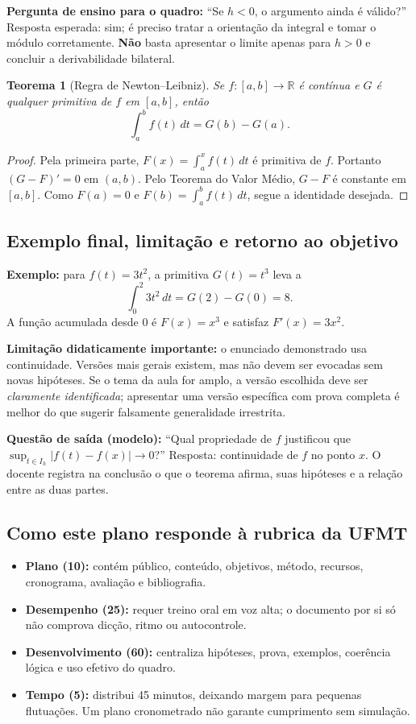 \documentclass[11pt,a4paper]{article}
\newtheorem{teorema}{Teorema}
\begin{document}
\textbf{Pergunta de ensino para o quadro:} ``Se $h<0$, o argumento ainda é válido?'' Resposta esperada: sim; é preciso tratar a orientação da integral e tomar o módulo corretamente. \textbf{Não} basta apresentar o limite apenas para $h>0$ e concluir a derivabilidade bilateral.

\begin{teorema}[Regra de Newton--Leibniz]
Se $f:[a,b]\to\mathbb R$ é contínua e $G$ é qualquer primitiva de $f$ em $[a,b]$, então
\[\int_a^b f(t)\,dt=G(b)-G(a).\]
\end{teorema}
\begin{proof}
Pela primeira parte, $F(x)=\int_a^x f(t)\,dt$ é primitiva de $f$. Portanto $(G-F)'=0$ em $(a,b)$. Pelo Teorema do Valor Médio, $G-F$ é constante em $[a,b]$. Como $F(a)=0$ e $F(b)=\int_a^b f(t)\,dt$, segue a identidade desejada.
\end{proof}

\subsection{Exemplo final, limitação e retorno ao objetivo}
\textbf{Exemplo:} para $f(t)=3t^2$, a primitiva $G(t)=t^3$ leva a
\[
\int_0^2 3t^2\,dt=G(2)-G(0)=8.
\]
A função acumulada desde 0 é $F(x)=x^3$ e satisfaz $F'(x)=3x^2$.

\textbf{Limitação didaticamente importante:} o enunciado demonstrado usa continuidade. Versões mais gerais existem, mas não devem ser evocadas sem novas hipóteses. Se o tema da aula for amplo, a versão escolhida deve ser \emph{claramente identificada}; apresentar uma versão específica com prova completa é melhor do que sugerir falsamente generalidade irrestrita.

\textbf{Questão de saída (modelo):} ``Qual propriedade de $f$ justificou que $\sup_{t\in I_h}|f(t)-f(x)|\to0$?'' Resposta: continuidade de $f$ no ponto $x$. O docente registra na conclusão o que o teorema afirma, suas hipóteses e a relação entre as duas partes.

\subsection{Como este plano responde à rubrica da UFMT}
\begin{itemize}
\item \textbf{Plano (10):} contém público, conteúdo, objetivos, método, recursos, cronograma, avaliação e bibliografia.
\item \textbf{Desempenho (25):} requer treino oral em voz alta; o documento por si só não comprova dicção, ritmo ou autocontrole.
\item \textbf{Desenvolvimento (60):} centraliza hipóteses, prova, exemplos, coerência lógica e uso efetivo do quadro.
\item \textbf{Tempo (5):} distribui 45 minutos, deixando margem para pequenas flutuações. Um plano cronometrado não garante cumprimento sem simulação.
\end{itemize}
\end{document}
